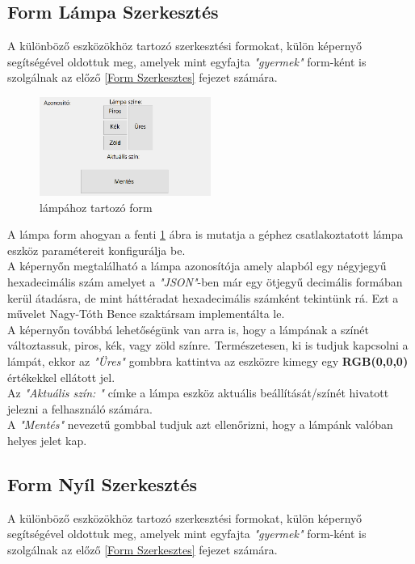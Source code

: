 \documentclass[tocnopagenum]{thesis-ekf}
\theoremstyle{definition}
\theoremstyle{remark}
\begin{document}
	\subsection{Form Lámpa Szerkesztés}
	A különböző eszközökhöz tartozó szerkesztési formokat, külön képernyő segítségével oldottuk meg, amelyek mint egyfajta \textit{"gyermek"} form-ként is szolgálnak az előző \ref{Form Szerkesztes} fejezet számára.
	\begin{figure}[h!]	
		\centering
		\includegraphics[page=1,width=0.5\textwidth]{lamp_form}
		\caption[Lampa form]{lámpához tartozó form}
		\label{fig:lampaform}
	\end{figure}
	A lámpa form ahogyan a fenti \ref{fig:lampaform} ábra is mutatja a géphez csatlakoztatott lámpa eszköz paramétereit konfigurálja be.
	\\
	A képernyőn megtalálható a lámpa azonosítója amely alapból egy négyjegyű hexadecimális szám amelyet a \textit{"JSON"}-ben már egy ötjegyű decimális formában kerül átadásra, de mint háttéradat hexadecimális számként tekintünk rá. Ezt a művelet Nagy-Tóth Bence szaktársam implementálta le.
	\\
	A képernyőn továbbá lehetőségünk van arra is, hogy a lámpának a színét változtassuk, piros, kék, vagy zöld színre.
	Természetesen, ki is tudjuk kapcsolni a lámpát, ekkor az \textit{"Üres"} gombbra kattintva az eszközre kimegy egy \textbf{RGB(0,0,0)} értékekkel ellátott jel.
	\\
	Az \textit{"Aktuális szín: "} címke a lámpa eszköz aktuális beállítását/színét hivatott jelezni a felhasználó számára.
	\\
	A \textit{"Mentés"} nevezetű gombbal tudjuk azt ellenőrizni, hogy a lámpánk valóban helyes jelet kap.
	
	
	\subsection{Form Nyíl Szerkesztés}
	A különböző eszközökhöz tartozó szerkesztési formokat, külön képernyő segítségével oldottuk meg, amelyek mint egyfajta \textit{"gyermek"} form-ként is szolgálnak az előző \ref{Form Szerkesztes} fejezet számára.
	
\end{document}
